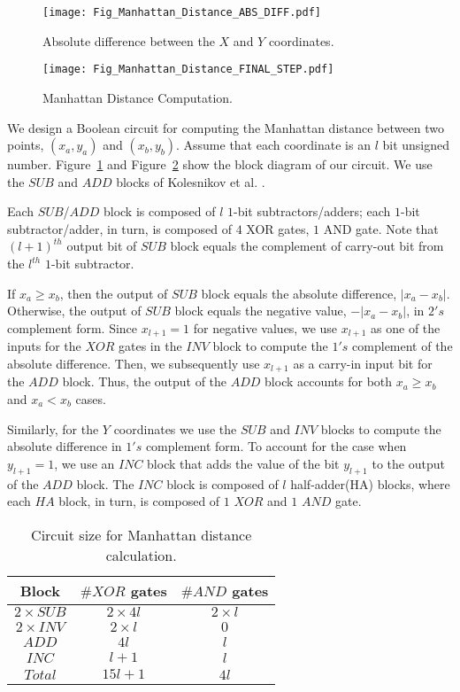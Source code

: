 \documentclass[10pt,journal,cspaper,compsoc]{IEEEtran}
\begin{document}
\begin{figure}[t]
\centering
\texttt{[image: Fig\_Manhattan\_Distance\_ABS\_DIFF.pdf]}
\caption{Absolute difference between the $X$ and $Y$ coordinates.}\label{fig_absolute_diff}
\end{figure}

\begin{figure}[t]
\centering
\texttt{[image: Fig\_Manhattan\_Distance\_FINAL\_STEP.pdf]}
\caption{Manhattan Distance Computation.}\label{fig_manhattan_dist_final_step}
\end{figure}


We design a Boolean circuit for computing the Manhattan distance between two points, $(x_a, y_a)$ and $(x_b, y_b)$. Assume that each coordinate is an $l$ bit unsigned number. Figure~\ref{fig_absolute_diff} and Figure~\ref{fig_manhattan_dist_final_step} show the block diagram of our circuit. We use the $SUB$ and $ADD$ blocks of Kolesnikov et al. \cite{kolesnikov09}.


Each $SUB$/$ADD$ block is composed of $l$ $1$-bit subtractors/adders; each $1$-bit subtractor/adder, in turn, is composed of $4$ XOR gates, $1$ AND gate. Note that $(l+1)^{th}$ output bit of $SUB$ block equals the complement of carry-out bit from the $l^{th}$ $1$-bit subtractor.


If $x_a \geq x_b$, then the output of $SUB$ block equals the absolute difference, $|x_a - x_b|$. Otherwise, the output of $SUB$ block equals the negative value, $-|x_a - x_b|$, in $2's$ complement form. Since $x_{l+1}=1$ for negative values, we use $x_{l+1}$ as one of the inputs for the $XOR$ gates in the $INV$ block to compute the $1's$ complement of the absolute difference. Then, we subsequently use $x_{l+1}$ as a carry-in input bit for the $ADD$ block. Thus, the output of the $ADD$ block accounts for both $x_a \geq x_b$ and $x_a < x_b$ cases.


Similarly, for the $Y$ coordinates we use the $SUB$ and $INV$ blocks to compute the absolute difference in $1's$ complement form. To account for the case when $y_{l+1}=1$, we use an $INC$ block that adds the value of the bit $y_{l+1}$ to the output of the $ADD$ block. The $INC$ block is composed of $l$ half-adder(HA) blocks, where each $HA$ block, in turn, is composed of $1$ $XOR$ and $1$ $AND$ gate.

\begin{table}[!t]
\renewcommand{\arraystretch}{1.3}
\caption{Circuit size for Manhattan distance calculation.}
\label{table_manhattan_dist_calc}
\centering
\begin{tabular}{||c||c||c||}
\hline
\bfseries Block & \bfseries $\#XOR$ gates & \bfseries $\#AND$ gates\\
\hline
$2\times SUB$ & $2\times 4l$ & $2\times l$\\
\hline
$2\times INV$ & $2\times l$ & $0$\\
\hline
$ADD$ & $4l$ & $l$\\
\hline
$INC$ & $l+1$ & $l$\\
\hline
$Total$ & $15l+1$ & $4l$\\
\hline
\end{tabular}
\end{table}
\end{document}
